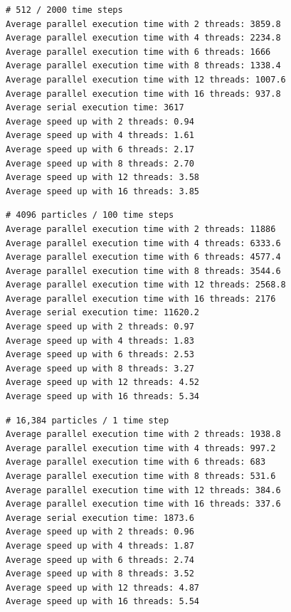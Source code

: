 \documentclass{article}
\begin{document}
\begin{boxA}
    \begin{verbatim}
# 512 / 2000 time steps
Average parallel execution time with 2 threads: 3859.8
Average parallel execution time with 4 threads: 2234.8
Average parallel execution time with 6 threads: 1666
Average parallel execution time with 8 threads: 1338.4
Average parallel execution time with 12 threads: 1007.6
Average parallel execution time with 16 threads: 937.8
Average serial execution time: 3617
Average speed up with 2 threads: 0.94
Average speed up with 4 threads: 1.61
Average speed up with 6 threads: 2.17
Average speed up with 8 threads: 2.70
Average speed up with 12 threads: 3.58
Average speed up with 16 threads: 3.85
\end{verbatim}
\end{boxA}

\begin{boxA}
    \begin{verbatim}
# 4096 particles / 100 time steps
Average parallel execution time with 2 threads: 11886
Average parallel execution time with 4 threads: 6333.6
Average parallel execution time with 6 threads: 4577.4
Average parallel execution time with 8 threads: 3544.6
Average parallel execution time with 12 threads: 2568.8
Average parallel execution time with 16 threads: 2176
Average serial execution time: 11620.2
Average speed up with 2 threads: 0.97
Average speed up with 4 threads: 1.83
Average speed up with 6 threads: 2.53
Average speed up with 8 threads: 3.27
Average speed up with 12 threads: 4.52
Average speed up with 16 threads: 5.34
\end{verbatim}
\end{boxA}

\begin{boxA}
    \begin{verbatim}
# 16,384 particles / 1 time step
Average parallel execution time with 2 threads: 1938.8
Average parallel execution time with 4 threads: 997.2
Average parallel execution time with 6 threads: 683
Average parallel execution time with 8 threads: 531.6
Average parallel execution time with 12 threads: 384.6
Average parallel execution time with 16 threads: 337.6
Average serial execution time: 1873.6
Average speed up with 2 threads: 0.96
Average speed up with 4 threads: 1.87
Average speed up with 6 threads: 2.74
Average speed up with 8 threads: 3.52
Average speed up with 12 threads: 4.87
Average speed up with 16 threads: 5.54
\end{verbatim}
\end{boxA}
\end{document}
